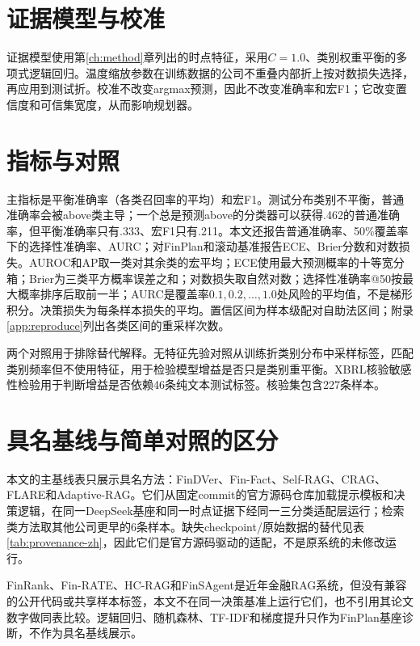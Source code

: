 \documentclass[12pt,openany]{ctexbook}
\begin{document}
\section{证据模型与校准}
证据模型使用第\ref{ch:method}章列出的时点特征，采用$C=1.0$、类别权重平衡的多项式逻辑回归。温度缩放参数在训练数据的公司不重叠内部折上按对数损失选择，再应用到测试折。校准不改变argmax预测，因此不改变准确率和宏F1；它改变置信度和可信集宽度，从而影响规划器。\par

\section{指标与对照}
主指标是平衡准确率（各类召回率的平均）\cite{brodersen2010balanced}和宏F1\cite{sokolova2009performance}。测试分布类别不平衡，普通准确率会被above类主导；一个总是预测above的分类器可以获得.462的普通准确率，但平衡准确率只有.333、宏F1只有.211。本文还报告普通准确率、50\%覆盖率下的选择性准确率、AURC；对FinPlan和滚动基准报告ECE、Brier分数和对数损失。AUROC和AP取一类对其余类的宏平均；ECE使用最大预测概率的十等宽分箱；Brier为三类平方概率误差之和；对数损失取自然对数；选择性准确率@50按最大概率排序后取前一半；AURC是覆盖率$0.1,0.2,\dots,1.0$处风险的平均值，不是梯形积分。决策损失为每条样本损失的平均。置信区间为样本级配对自助法区间；附录\ref{app:reproduce}列出各类区间的重采样次数。\par
两个对照用于排除替代解释。无特征先验对照从训练折类别分布中采样标签，匹配类别频率但不使用特征，用于检验模型增益是否只是类别重平衡。XBRL核验敏感性检验用于判断增益是否依赖46条纯文本测试标签。核验集包含227条样本。\par

\section{具名基线与简单对照的区分}
本文的主基线表只展示具名方法：FinDVer、Fin-Fact、Self-RAG、CRAG、FLARE和Adaptive-RAG。它们从固定commit的官方源码仓库加载提示模板和决策逻辑，在同一DeepSeek基座和同一时点证据下经同一三分类适配层运行；检索类方法取其他公司更早的6条样本。缺失checkpoint/原始数据的替代见表\ref{tab:provenance-zh}，因此它们是官方源码驱动的适配，不是原系统的未修改运行。\par
FinRank、Fin-RATE、HC-RAG和FinSAgent是近年金融RAG系统，但没有兼容的公开代码或共享样本标签，本文不在同一决策基准上运行它们，也不引用其论文数字做同表比较。逻辑回归、随机森林、TF-IDF和梯度提升只作为FinPlan基座诊断，不作为具名基线展示。\par
\end{document}
